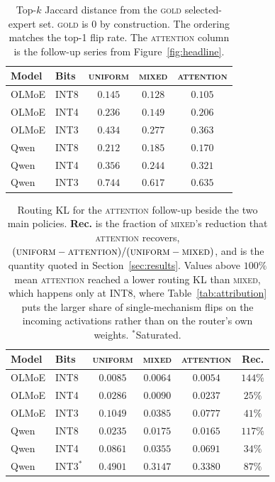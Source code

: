 \documentclass[11pt]{article}
\newcommand{\gold}{\textsc{gold}}
\newcommand{\uniform}{\textsc{uniform}}
\newcommand{\mixed}{\textsc{mixed}}
\newcommand{\attn}{\textsc{attention}}
\begin{document}
\begin{table}[t]
\centering
\small
\setlength{\tabcolsep}{4pt}
\begin{tabular}{llccc}
\toprule
Model & Bits & \uniform{} & \mixed{} & \attn{} \\
\midrule
OLMoE & INT8 & $0.145$ & $0.128$ & $0.105$ \\
OLMoE & INT4 & $0.236$ & $0.149$ & $0.206$ \\
OLMoE & INT3 & $0.434$ & $0.277$ & $0.363$ \\
Qwen & INT8 & $0.212$ & $0.185$ & $0.170$ \\
Qwen & INT4 & $0.356$ & $0.244$ & $0.321$ \\
Qwen & INT3 & $0.744$ & $0.617$ & $0.635$ \\
\bottomrule
\end{tabular}
\caption{Top-$k$ Jaccard distance from the \gold{} selected-expert set.
  \gold{} is $0$ by construction. The ordering matches the top-1 flip
  rate. The \attn{} column is the follow-up series from
  Figure~\ref{fig:headline}.}
\label{tab:appendix-jaccard}
\end{table}

\begin{table}[t]
\centering
\footnotesize
\setlength{\tabcolsep}{3pt}
\begin{tabular}{llcccc}
\toprule
Model & Bits & \uniform{} & \mixed{} & \attn{} & Rec. \\
\midrule
OLMoE & INT8 & $0.0085$ & $0.0064$ & $0.0054$ & $144\%$ \\
OLMoE & INT4 & $0.0286$ & $0.0090$ & $0.0237$ & $25\%$ \\
OLMoE & INT3 & $0.1049$ & $0.0385$ & $0.0777$ & $41\%$ \\
Qwen & INT8 & $0.0235$ & $0.0175$ & $0.0165$ & $117\%$ \\
Qwen & INT4 & $0.0861$ & $0.0355$ & $0.0691$ & $34\%$ \\
Qwen & INT3$^{*}$ & $0.4901$ & $0.3147$ & $0.3380$ & $87\%$ \\
\bottomrule
\end{tabular}
\caption{Routing KL for the \attn{} follow-up beside the two main
  policies. \textbf{Rec.} is the fraction of \mixed{}'s reduction that
  \attn{} recovers, $(\uniform{}-\attn{})/(\uniform{}-\mixed{})$, and is
  the quantity quoted in Section~\ref{sec:results}. Values above $100\%$
  mean \attn{} reached a lower routing KL than \mixed{}, which happens
  only at INT8, where Table~\ref{tab:attribution} puts the larger share of
  single-mechanism flips on the incoming activations rather than on the
  router's own weights. $^{*}$Saturated.}
\label{tab:appendix-attnkl}
\end{table}
\end{document}
